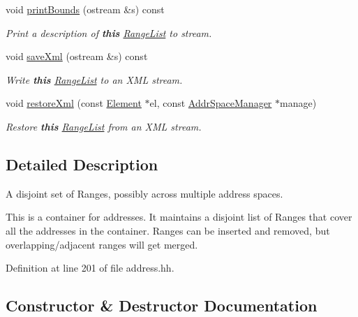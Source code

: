 \begin{DoxyCompactItemize}
void \mbox{\hyperlink{class_range_list_ae9ed76aecdefbd58a4173fafb082a26c}{print\+Bounds}} (ostream \&s) const
\begin{DoxyCompactList}\small\item\em Print a description of {\bfseries{this}} \mbox{\hyperlink{class_range_list}{Range\+List}} to stream. \end{DoxyCompactList}\item 
void \mbox{\hyperlink{class_range_list_a026dc31507600a1c8786b1d201f7a19e}{save\+Xml}} (ostream \&s) const
\begin{DoxyCompactList}\small\item\em Write {\bfseries{this}} \mbox{\hyperlink{class_range_list}{Range\+List}} to an X\+ML stream. \end{DoxyCompactList}\item 
void \mbox{\hyperlink{class_range_list_a7a7c7b47cec0a38e75169896e08899d0}{restore\+Xml}} (const \mbox{\hyperlink{class_element}{Element}} $\ast$el, const \mbox{\hyperlink{class_addr_space_manager}{Addr\+Space\+Manager}} $\ast$manage)
\begin{DoxyCompactList}\small\item\em Restore {\bfseries{this}} \mbox{\hyperlink{class_range_list}{Range\+List}} from an X\+ML stream. \end{DoxyCompactList}\end{DoxyCompactItemize}


\subsection{Detailed Description}
A disjoint set of Ranges, possibly across multiple address spaces. 

This is a container for addresses. It maintains a disjoint list of Ranges that cover all the addresses in the container. Ranges can be inserted and removed, but overlapping/adjacent ranges will get merged. 

Definition at line 201 of file address.\+hh.



\subsection{Constructor \& Destructor Documentation}
\mbox{\label{class_range_list_ae8b5850c722bc4e7b612d87ca6a43fab}} 
